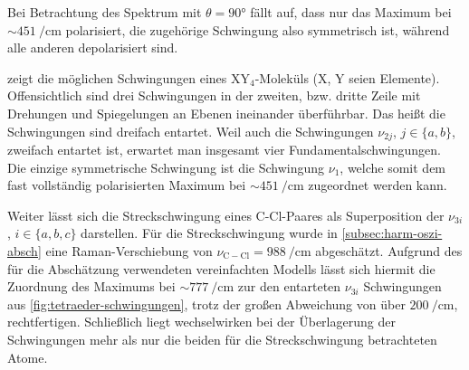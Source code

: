 \documentclass[../bericht.tex]{subfiles}
\begin{document}
        Bei Betrachtung des Spektrum mit $\theta=\ang{90}$ fällt auf, dass nur das Maximum bei $\sim\SI{451}{\per\centi\meter}$ polarisiert, die zugehörige Schwingung also symmetrisch ist, während alle anderen depolarisiert sind.

         zeigt die möglichen Schwingungen eines $\mathrm{XY_4}$-Moleküls (X, Y seien Elemente). Offensichtlich sind drei Schwingungen in der zweiten, bzw. dritte Zeile mit Drehungen und Spiegelungen an Ebenen ineinander überführbar. Das heißt die Schwingungen sind dreifach entartet. Weil auch die Schwingungen $\nu_{2j}$, $j\in\{a,b\}$, zweifach entartet ist, erwartet man insgesamt vier Fundamentalschwingungen. Die einzige symmetrische Schwingung ist die Schwingung $\nu_1$, welche somit dem fast vollständig polarisierten Maximum bei $\sim\SI{451}{\per\centi\meter}$ zugeordnet werden kann.
        \medskip

        Weiter lässt sich die Streckschwingung eines C-Cl-Paares als Superposition der $\nu_{3i}$, $i\in\{ a,b,c\}$ darstellen. Für die Streckschwingung wurde in \cref{subsec:harm-oszi-absch} eine Raman-Verschiebung von $\nu_\mathrm{C-Cl}=\SI{988}{\per\centi\meter}$ abgeschätzt. Aufgrund des für die Abschätzung verwendeten vereinfachten Modells lässt sich hiermit die Zuordnung des Maximums bei $\sim \SI{777}{\per\centi\meter}$ zur den entarteten $\nu_{3i}$ Schwingungen aus \cref{fig:tetraeder-schwingungen}, trotz der großen Abweichung von über $\SI{200}{\per\centi\meter}$, rechtfertigen. Schließlich liegt wechselwirken bei der Überlagerung der Schwingungen mehr als nur die beiden für die Streckschwingung betrachteten Atome.
        \medskip
\end{document}
